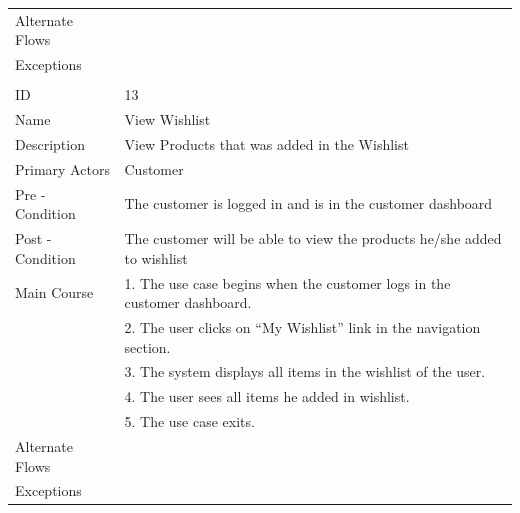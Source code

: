 \documentclass{report}
\begin{document}
\begin{tabular}{ l l }
Alternate Flows		& \\
Exceptions 			& \\ \\
ID 					& 13 \\
Name 				& View Wishlist \\
Description 			& View Products that was added in the Wishlist\\ 
Primary Actors 		& Customer \\
Pre - Condition 		& The customer is logged in and is in the customer dashboard \\ 
Post - Condition 	& The customer will be able to view the products he/she added to wishlist \\ 
Main Course			& 1. The use case begins when the customer logs in the customer dashboard. \\
					& 2. The user clicks on “My Wishlist” link in the navigation section. \\
					& 3. The system displays all items in the wishlist of the user. \\
					& 4. The user sees all items he added in wishlist. \\
					& 5. The use case exits.\\
Alternate Flows		& \\
Exceptions 			& \\

\end{tabular}
\newpage
\end{document}
